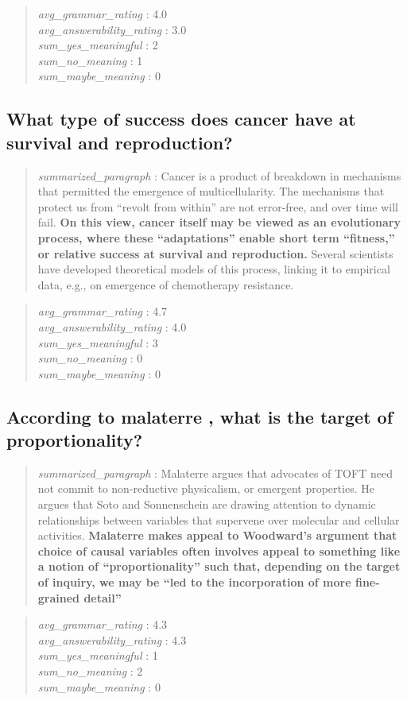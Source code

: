 \begin{quote}
\emph{avg\_grammar\_rating} : 4.0\\
\emph{avg\_answerability\_rating} : 3.0\\
\emph{sum\_yes\_meaningful} : 2\\
\emph{sum\_no\_meaning} : 1\\
\emph{sum\_maybe\_meaning} : 0
\end{quote}

\hypertarget{what-type-of-success-does-cancer-have-at-survival-and-reproduction}{%
\subsection{What type of success does cancer have at survival and
reproduction?}\label{what-type-of-success-does-cancer-have-at-survival-and-reproduction}}

\begin{quote}
\emph{summarized\_paragraph} : Cancer is a product of breakdown in
mechanisms that permitted the emergence of multicellularity. The
mechanisms that protect us from ``revolt from within'' are not
error-free, and over time will fail. \textbf{On this view, cancer itself
may be viewed as an evolutionary process, where these ``adaptations''
enable short term ``fitness,'' or relative success at survival and
reproduction.} Several scientists have developed theoretical models of
this process, linking it to empirical data, e.g., on emergence of
chemotherapy resistance.
\end{quote}

\begin{quote}
\emph{avg\_grammar\_rating} : 4.7\\
\emph{avg\_answerability\_rating} : 4.0\\
\emph{sum\_yes\_meaningful} : 3\\
\emph{sum\_no\_meaning} : 0\\
\emph{sum\_maybe\_meaning} : 0
\end{quote}

\hypertarget{according-to-malaterre-what-is-the-target-of-proportionality}{%
\subsection{According to malaterre , what is the target of
proportionality?}\label{according-to-malaterre-what-is-the-target-of-proportionality}}

\begin{quote}
\emph{summarized\_paragraph} : Malaterre argues that advocates of TOFT
need not commit to non-reductive physicalism, or emergent properties. He
argues that Soto and Sonnenschein are drawing attention to dynamic
relationships between variables that supervene over molecular and
cellular activities. \textbf{Malaterre makes appeal to Woodward's
argument that choice of causal variables often involves appeal to
something like a notion of ``proportionality'' such that, depending on
the target of inquiry, we may be ``led to the incorporation of more
fine-grained detail''}
\end{quote}

\begin{quote}
\emph{avg\_grammar\_rating} : 4.3\\
\emph{avg\_answerability\_rating} : 4.3\\
\emph{sum\_yes\_meaningful} : 1\\
\emph{sum\_no\_meaning} : 2\\
\emph{sum\_maybe\_meaning} : 0
\end{quote}
